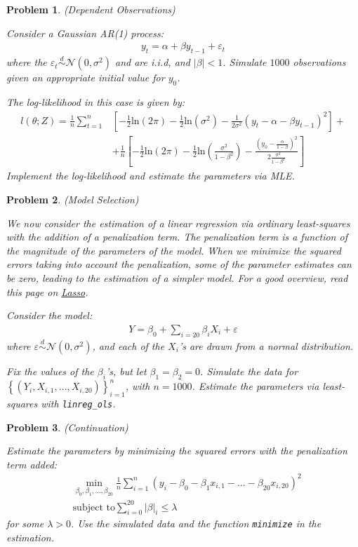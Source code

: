 \documentclass[12pt, a4paper]{article}
\newcommand{\abs}[1]{\left\vert{#1}\right\vert}
\newcommand{\Normal}[1]{\mathcal{N}\left(0, #1\right)}
\newcommand{\Set}[1]{\left\{#1\right\}}
\renewcommand{\ln}[1]{\text{ln}\left(#1\right)}
\newtheorem{problem}{Problem}
\begin{document}
\begin{problem}
(Dependent Observations)

Consider a Gaussian AR(1) process:
\begin{align*}
y_t = \alpha + \beta y_{t-1} + \varepsilon_t
\end{align*}
where the \(\varepsilon_t\overset{d}{\sim}\Normal{\sigma^2}\) and are i.i.d, and \(\abs{\beta}<1\).
Simulate \(1000\) observations given an appropriate initial value for \(y_0\).

The log-likelihood in this case is given by:
\begin{align*}
  l(\theta; Z)=\frac{1}{n}\sum_{t=1}^n&\left[-\frac{1}{2}\ln{2\pi}-\frac{1}{2}\ln{\sigma^2}-\frac{1}{2\sigma^2}(y_t-\alpha-\beta y_{t-1})^2\right] +\\
& +\frac{1}{n}\left[-\frac{1}{2}\ln{2\pi}-\frac{1}{2}\ln{\frac{\sigma^2}{1-\beta^2}}-\frac{(y_0-\frac{\alpha}{1-\beta})^2}{2\frac{\sigma^2}{1-\beta^2}}\right]
\end{align*}
Implement the log-likelihood and estimate the parameters via MLE.
\end{problem}

\begin{problem}
(Model Selection)

We now consider the estimation of a linear regression via ordinary least-squares with the addition of a penalization term.
The penalization term is a function of the magnitude of the parameters of the model.
When we minimize the squared errors taking into account the penalization, some of the parameter estimates can be zero, leading to the estimation of a simpler model.
For a good overview, read this page on \href{https://en.wikipedia.org/wiki/Lasso\_(statistics)}{Lasso}.

Consider the model:
\begin{align*}
Y = \beta_0 + \sum_{i=20}\beta_i X_i + \varepsilon
\end{align*}
where \(\varepsilon\overset{d}{\sim}\Normal{\sigma^2}\), and each of the \(X_i\)'s are drawn from a normal distribution.

Fix the values of the \(\beta_i\)'s, but let \(\beta_1=\beta_2=0\).
Simulate the data for \(\Set{(Y_i, X_{i, 1}, \ldots, X_{i, 20})}_{i=1}^n\), with \(n=1000\).
Estimate the parameters via least-squares with \texttt{linreg\_ols}.
\end{problem}

\begin{problem}
(Continuation)

Estimate the parameters by minimizing the squared errors with the penalization term added:
\begin{align*}
&\min_{\beta_0,\beta_1,\ldots,\beta_{20}}{\frac{1}{n}\sum_{i=1}^n(y_i-\beta_0-\beta_1x_{i, 1} - \ldots - \beta_{20}x_{i, 20})^2}\\
&\text{subject to}\sum_{i=0}^{20}\abs{\beta}_i \leq \lambda
\end{align*}
for some \(\lambda > 0\).
Use the simulated data and the function \texttt{minimize} in the estimation.
\end{problem}
\end{document}
